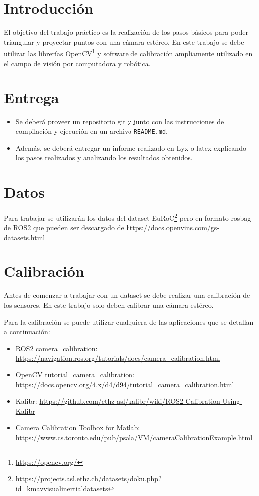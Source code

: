 \documentclass[tp]{lcc}
\begin{document}
\maketitle

\section{Introducción}

El objetivo del trabajo práctico es la realización de los pasos básicos para poder triangular y proyectar puntos con una cámara estéreo. En este trabajo se debe utilizar  las librerías OpenCV\footnote{\url{https://opencv.org/}} y software de calibración ampliamente utilizado en el campo de visión por computadora y robótica.


\section{Entrega}
\begin{itemize}
	\item Se deberá proveer un repositorio git y junto con las instrucciones de compilación y ejecución en un archivo \lstinline{README.md}.
	\item Además, se deberá entregar un informe realizado en Lyx o latex explicando los pasos realizados y analizando los resultados obtenidos.
\end{itemize}

\section{Datos}
Para trabajar se utilizarán los datos del dataset EuRoC\footnote{\url{https://projects.asl.ethz.ch/datasets/doku.php?id=kmavvisualinertialdatasets}} pero en formato rosbag de ROS2 que pueden ser descargado de \url{https://docs.openvins.com/gs-datasets.html}

\section{Calibración}
Antes de comenzar a trabajar con un dataset se debe realizar una calibración de los sensores. En este trabajo solo deben calibrar una cámara estéreo.

Para la calibración se puede utilizar cualquiera de las aplicaciones que se detallan a continuación:
\begin{itemize}
	\item ROS2 camera\_calibration:  \url{https://navigation.ros.org/tutorials/docs/camera_calibration.html}
	\item OpenCV tutorial\_camera\_calibration:\\ \url{https://docs.opencv.org/4.x/d4/d94/tutorial_camera_calibration.html}
	\item Kalibr: \url{https://github.com/ethz-asl/kalibr/wiki/ROS2-Calibration-Using-Kalibr}
	\item Camera Calibration Toolbox for Matlab:\\ \url{https://www.cs.toronto.edu/pub/psala/VM/cameraCalibrationExample.html}
\end{itemize}
\end{document}
